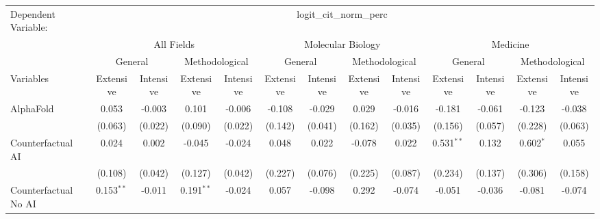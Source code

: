 \begingroup
\centering
\begin{tabular}{lcccccccccccc}
   \tabularnewline \midrule \midrule
   Dependent Variable: & \multicolumn{12}{c}{logit\_cit\_norm\_perc}\\
 & \multicolumn{4}{c}{All Fields} & \multicolumn{4}{c}{Molecular Biology} & \multicolumn{4}{c}{Medicine} \\
\cmidrule(lr){2-5} \cmidrule(lr){6-9} \cmidrule(lr){10-13}
 & \multicolumn{2}{c}{General} & \multicolumn{2}{c}{Methodological} & \multicolumn{2}{c}{General} & \multicolumn{2}{c}{Methodological} & \multicolumn{2}{c}{General} & \multicolumn{2}{c}{Methodological} \\
\cmidrule(lr){2-3} \cmidrule(lr){4-5} \cmidrule(lr){6-7} \cmidrule(lr){8-9} \cmidrule(lr){10-11} \cmidrule(lr){12-13}
Variables & \multicolumn{1}{c}{Extensive} & \multicolumn{1}{c}{Intensive} & \multicolumn{1}{c}{Extensive} & \multicolumn{1}{c}{Intensive} & \multicolumn{1}{c}{Extensive} & \multicolumn{1}{c}{Intensive} & \multicolumn{1}{c}{Extensive} & \multicolumn{1}{c}{Intensive} & \multicolumn{1}{c}{Extensive} & \multicolumn{1}{c}{Intensive} & \multicolumn{1}{c}{Extensive} & \multicolumn{1}{c}{Intensive} \\
\cmidrule(lr){1-1}\cmidrule(lr){2-2} \cmidrule(lr){3-3} \cmidrule(lr){4-4} \cmidrule(lr){5-5} \cmidrule(lr){6-6} \cmidrule(lr){7-7} \cmidrule(lr){8-8} \cmidrule(lr){9-9} \cmidrule(lr){10-10} \cmidrule(lr){11-11} \cmidrule(lr){12-12} \cmidrule(lr){13-13}
   AlphaFold                                & 0.053        & -0.003   & 0.101         & -0.006   & -0.108  & -0.029  & 0.029         & -0.016  & -0.181       & -0.061  & -0.123      & -0.038\\   
                                            & (0.063)      & (0.022)  & (0.090)       & (0.022)  & (0.142) & (0.041) & (0.162)       & (0.035) & (0.156)      & (0.057) & (0.228)     & (0.063)\\   
   Counterfactual AI                        & 0.024        & 0.002    & -0.045        & -0.024   & 0.048   & 0.022   & -0.078        & 0.022   & 0.531$^{**}$ & 0.132   & 0.602$^{*}$ & 0.055\\   
                                            & (0.108)      & (0.042)  & (0.127)       & (0.042)  & (0.227) & (0.076) & (0.225)       & (0.087) & (0.234)      & (0.137) & (0.306)     & (0.158)\\   
   Counterfactual No AI                     & 0.153$^{**}$ & -0.011   & 0.191$^{**}$  & -0.024   & 0.057   & -0.098  & 0.292         & -0.074  & -0.051       & -0.036  & -0.081      & -0.074\\   

\end{tabular}
